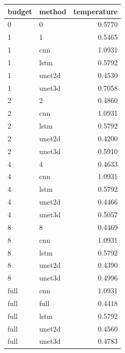 \begin{tabular}{llr}
\toprule
budget & method & temperature \\
\midrule
0 & 0 & 0.5770 \\
1 & 1 & 0.5465 \\
1 & cnn & 1.0931 \\
1 & lstm & 0.5792 \\
1 & unet2d & 0.4530 \\
1 & unet3d & 0.7058 \\
2 & 2 & 0.4860 \\
2 & cnn & 1.0931 \\
2 & lstm & 0.5792 \\
2 & unet2d & 0.4200 \\
2 & unet3d & 0.5910 \\
4 & 4 & 0.4633 \\
4 & cnn & 1.0931 \\
4 & lstm & 0.5792 \\
4 & unet2d & 0.4466 \\
4 & unet3d & 0.5057 \\
8 & 8 & 0.4469 \\
8 & cnn & 1.0931 \\
8 & lstm & 0.5792 \\
8 & unet2d & 0.4390 \\
8 & unet3d & 0.4996 \\
full & cnn & 1.0931 \\
full & full & 0.4418 \\
full & lstm & 0.5792 \\
full & unet2d & 0.4560 \\
full & unet3d & 0.4783 \\
\bottomrule
\end{tabular}
